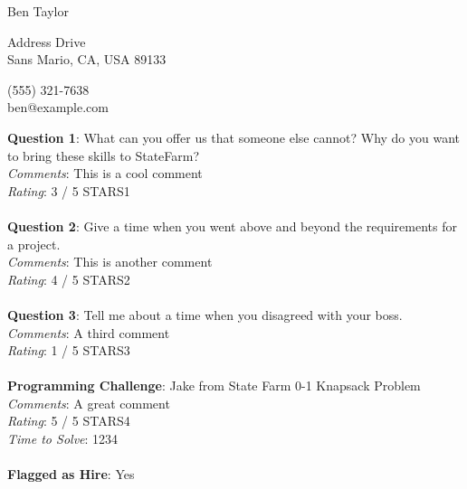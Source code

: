 \documentclass[12pt]{article}
\begin{document}
{\LARGE \begin{center}Ben Taylor\end{center}}

\begin{multicols}{2}
 Address Drive \\
Sans Mario, CA, USA 89133
\columnbreak

\noindent
(555) 321-7638 \\
ben@example.com
\end{multicols}

\noindent
\textbf{Question 1}: What can you offer us that someone else cannot? Why do you want to bring these skills to StateFarm?
\\\noindent
\textit{Comments}: This is a cool comment
\\\noindent
\textit{Rating}: 3 / 5 {STARS1}
\\\\
\noindent
\textbf{Question 2}: Give a time when you went above and beyond the requirements for a project.
\\\noindent
\textit{Comments}: This is another comment
\\\noindent
\textit{Rating}: 4 / 5 {STARS2}
\\\\
\noindent
\textbf{Question 3}: Tell me about a time when you disagreed with your boss.
\\\noindent
\textit{Comments}: A third comment
\\\noindent
\textit{Rating}: 1 / 5 {STARS3}
\\\\
\noindent
\textbf{Programming Challenge}: Jake from State Farm 0-1 Knapsack Problem
\\\noindent
\textit{Comments}: A great  comment
\\\noindent
\textit{Rating}: 5 / 5 {STARS4}
\\\noindent
\textit{Time to Solve}: 1234
\\\\
\textbf{Flagged as Hire}: Yes
\\\\ 
\end{document}
